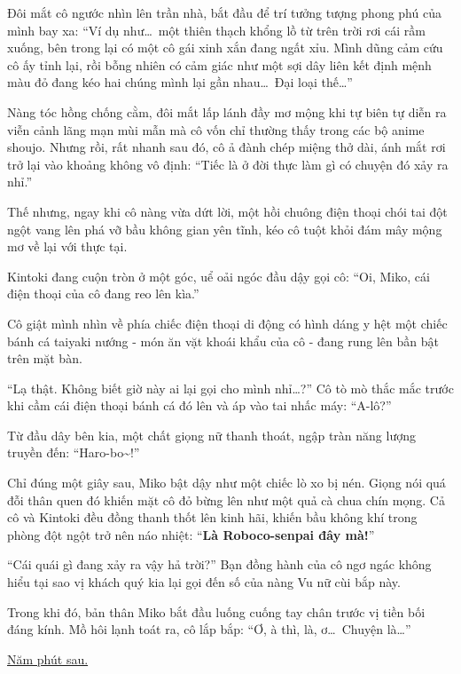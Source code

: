 \documentclass[../main.tex]{subfiles}
\begin{document}
Đôi mắt cô ngước nhìn lên trần nhà, bắt đầu để trí tưởng tượng phong phú của mình bay xa: ``Ví dụ như\dots\ một thiên thạch khổng lồ từ trên trời rơi cái rầm xuống, bên trong lại có một cô gái xinh xắn đang ngất xỉu. Mình dũng cảm cứu cô ấy tỉnh lại, rồi bỗng nhiên có cảm giác như một sợi dây liên kết định mệnh màu đỏ đang kéo hai chúng mình lại gần nhau\dots\ Đại loại thế\dots''


Nàng tóc hồng chống cằm, đôi mắt lấp lánh đầy mơ mộng khi tự biên tự diễn ra viễn cảnh lãng mạn mùi mẫn mà cô vốn chỉ thường thấy trong các bộ anime shoujo. Nhưng rồi, rất nhanh sau đó, cô ả đành chép miệng thở dài, ánh mắt rơi trở lại vào khoảng không vô định: ``Tiếc là ở đời thực làm gì có chuyện đó xảy ra nhỉ.''

Thế nhưng, ngay khi cô nàng vừa dứt lời, một hồi chuông điện thoại chói tai đột ngột vang lên phá vỡ bầu không gian yên tĩnh, kéo cô tuột khỏi đám mây mộng mơ về lại với thực tại.

Kintoki đang cuộn tròn ở một góc, uể oải ngóc đầu dậy gọi cô: ``Oi, Miko, cái điện thoại của cô đang reo lên kìa.''

Cô giật mình nhìn về phía chiếc điện thoại di động có hình dáng y hệt một chiếc bánh cá taiyaki nướng - món ăn vặt khoái khẩu của cô - đang rung lên bần bật trên mặt bàn.

``Lạ thật. Không biết giờ này ai lại gọi cho mình nhỉ\dots?'' Cô tò mò thắc mắc trước khi cầm cái điện thoại bánh cá đó lên và áp vào tai nhấc máy: ``A-lô?''

Từ đầu dây bên kia, một chất giọng nữ thanh thoát, ngập tràn năng lượng truyền đến: ``Haro-bo\~{}!''

Chỉ đúng một giây sau, Miko bật dậy như một chiếc lò xo bị nén. Giọng nói quá đỗi thân quen đó khiến mặt cô đỏ bừng lên như một quả cà chua chín mọng. Cả cô và Kintoki đều đồng thanh thốt lên kinh hãi, khiến bầu không khí trong phòng đột ngột trở nên náo nhiệt: ``\textbf{Là Roboco-senpai đây mà!}''


``Cái quái gì đang xảy ra vậy hả trời?'' Bạn đồng hành của cô ngơ ngác không hiểu tại sao vị khách quý kia lại gọi đến số của nàng Vu nữ cùi bắp này.

Trong khi đó, bản thân Miko bắt đầu luống cuống tay chân trước vị tiền bối đáng kính. Mồ hôi lạnh toát ra, cô lắp bắp: ``Ơ, à thì, là, ơ\dots\ Chuyện là\dots''

\begin{center}
  \underline{Năm phút sau.}
\end{center}
\end{document}

